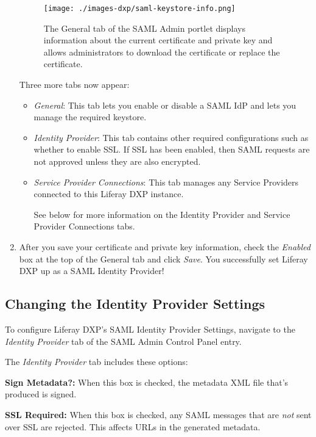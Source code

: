 \begin{enumerate}
  \begin{figure}
  \centering
  \texttt{[image: ./images-dxp/saml-keystore-info.png]}
  \caption{The General tab of the SAML Admin portlet displays
  information about the current certificate and private key and allows
  administrators to download the certificate or replace the
  certificate.}
  \end{figure}

  Three more tabs now appear:

  \begin{itemize}
  \item
    \emph{General}: This tab lets you enable or disable a SAML IdP and
    lets you manage the required keystore.
  \item
    \emph{Identity Provider}: This tab contains other required
    configurations such as whether to enable SSL. If SSL has been
    enabled, then SAML requests are not approved unless they are also
    encrypted.
  \item
    \emph{Service Provider Connections}: This tab manages any Service
    Providers connected to this Liferay DXP instance.

    See below for more information on the Identity Provider and Service
    Provider Connections tabs.
  \end{itemize}
\item
  After you save your certificate and private key information, check the
  \emph{Enabled} box at the top of the General tab and click
  \emph{Save}. You successfully set Liferay DXP up as a SAML Identity
  Provider!
\end{enumerate}

\subsection{Changing the Identity Provider
Settings}\label{changing-the-identity-provider-settings}

To configure Liferay DXP's SAML Identity Provider Settings, navigate to
the \emph{Identity Provider} tab of the SAML Admin Control Panel entry.

The \emph{Identity Provider} tab includes these options:

\textbf{Sign Metadata?:} When this box is checked, the metadata XML file
that's produced is signed.

\textbf{SSL Required:} When this box is checked, any SAML messages that
are \emph{not} sent over SSL are rejected. This affects URLs in the
generated metadata.

